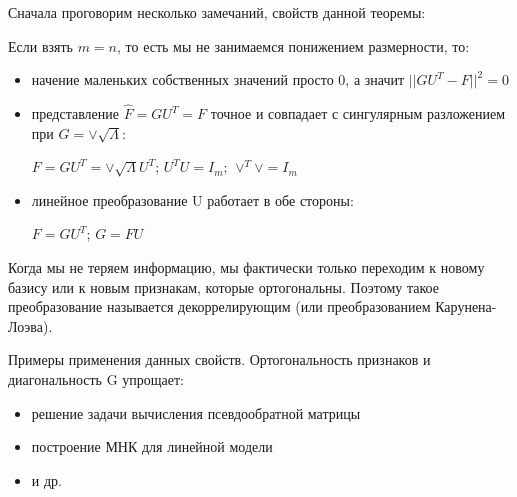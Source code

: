 Сначала проговорим несколько замечаний, свойств данной теоремы:\par
Если взять $m=n$, то есть мы не занимаемся понижением размерности, то: \par
\begin{itemize}
    \item начение маленьких собственных значений просто 0, а значит $||GU^T - F||^2 = 0$
    \item представление $\hat{F}=GU^T=F$ точное и совпадает с сингулярным разложением при $G=\vee\sqrt{\Lambda}$:\par
          $F=GU^T=\vee\sqrt{\Lambda}U^T$; $U^TU=I_m$; $\vee^T\vee=I_m$
    \item линейное преобразование U работает в обе стороны: \par
          $F=GU^T$; $G=FU$ \par
\end{itemize}\par
Когда мы не теряем информацию, мы фактически только переходим к новому базису или к новым признакам, которые ортогональны. Поэтому такое преобразование называется декоррелирующим (или преобразованием Карунена-Лоэва).


Примеры применения данных свойств. Ортогональность признаков и диагональность G упрощает:
\begin{itemize}
    \item решение задачи вычисления псевдообратной матрицы
    \item построение МНК для линейной модели
    \item и др.
\end{itemize}

